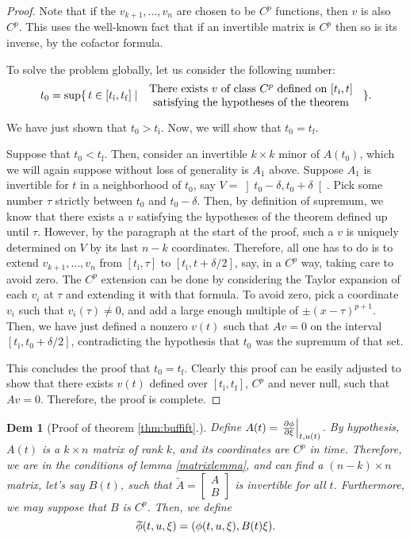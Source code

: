 \documentclass{article}
\theoremstyle{plain}
\theoremstyle{plain}
\theoremstyle{nonumberplain}
\newtheorem{proof}{Dem}
\theoremstyle{empty}
\newtheorem{proofref}{Dem}
\newcommand{\tstart}{\mathrm{i}}
\newcommand{\tend}{\mathrm{f}}
\newcommand{\wtphi}{
  \mspace{2mu}
  \widetilde{\mspace{-2mu}\smash[t]{\phi}}
}
\DeclarePairedDelimiter\eval{.}{\rvert}
\begin{document}
\begin{appendices}
\begin{proof}
Note that if the $v_{k+1}, \dots, v_n$ are chosen to be $C^p$ functions, then $v$ is also $C^p$. This uses the well-known fact that if an invertible matrix is $C^p$ then so is its inverse, by the cofactor formula.

To solve the problem globally, let us consider the following number:
\[t_0 = \sup \{\, t \in [t_\tstart, t_\tend] \mid \parbox{7cm}{\centering There exists $v$ of class $C^p$ defined on $[t_\tstart, t]$ satisfying the hypotheses of the theorem}\,\}.\]

We have just shown that $t_0 > t_\tstart$. Now, we will show that $t_0 = t_\tend$.

Suppose that $t_0 < t_\tend$. Then, consider an invertible $k \times k$ minor of $A(t_0)$, which we will again suppose without loss of generality is $A_1$ above. Suppose $A_1$ is invertible for $t$ in a neighborhood of $t_0$, say $V = \left]t_0 - \delta, t_0 + \delta\right[$. Pick some number $\tau$ strictly between $t_0$ and $t_0 - \delta$. Then, by definition of supremum, we know that there exists a $v$ satisfying the hypotheses of the theorem defined up until $\tau$. However, by the paragraph at the start of the proof, such a $v$ is uniquely determined on $V$ by its last $n-k$ coordinates. Therefore, all one has to do is to extend $v_{k+1}, \dots, v_n$ from $[t_\tstart, \tau]$ to $[t_\tstart, t+\delta/2]$, say, in a $C^p$ way, taking care to avoid zero. The $C^p$ extension can be done by considering the Taylor expansion of each $v_i$ at $\tau$ and extending it with that formula. To avoid zero, pick a coordinate $v_i$ such that $v_i(\tau) \neq 0$, and add a large enough multiple of $\pm (x-\tau)^{p+1}$. Then, we have just defined a nonzero $v(t)$ such that $Av=0$ on the interval $[t_\tstart, t_0 + \delta/2]$, contradicting the hypothesis that $t_0$ was the supremum of that set.

This concludes the proof that $t_0 = t_\tend$. Clearly this proof can be easily adjusted to show that there exists $v(t)$ defined over $[t_\tstart, t_\tend]$, $C^p$ and never null, such that $Av = 0$. Therefore, the proof is complete.
\end{proof}

\begin{proofref}[Proof of theorem \ref{thm:buffift}.]
Define $A(t) = \eval*{\diffp \phi \xi}_{t,u(t)}$. By hypothesis, $A(t)$ is a $k \times n$ matrix of rank $k$, and its coordinates are $C^p$ in time. Therefore, we are in the conditions of lemma \ref{matrixlemma}, and can find a $(n-k) \times n$ matrix, let's say $B(t)$, such that $\tilde A = \begin{bmatrix}A\\B\end{bmatrix}$ is invertible for all $t$. Furthermore, we may suppose that $B$ is $C^p$. Then, we define
\[\wtphi(t,u,\xi) = (\phi(t,u,\xi), B(t) \xi).\]


\end{proofref}
\end{appendices}
\end{document}
